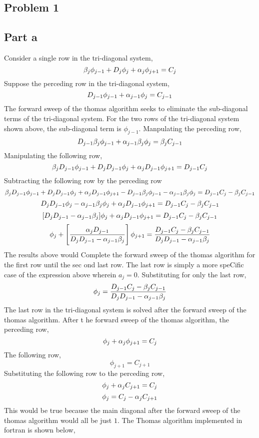 \documentclass[class=report, 12pt, crop=false]{standalone}
\begin{document}
\begin{center}
\section{Problem 1}
\begin{comment}
\end{comment}
\subsection{Part a}

Consider a single row in the tri-diagonal system,
$$\beta_j\phi_{j-1} + D_j\phi_{j} + \alpha_j\phi_{j+1} = C_j$$
Suppose the perceding row in the tri-diagonal system,
$$D_{j-1}\phi_{j-1} + \alpha_{j-1}\phi_{j} = C_{j-1}$$
The forward sweep of the thomas algorithm seeks to eliminate the sub-diagonal terms of the tri-diagonal system. For the two rows of the tri-diagonal system shown above, the sub-diagonal term is $\phi_{j-1}$. Manpulating the perceding row,
$$D_{j-1}\beta_j\phi_{j-1} + \alpha_{j-1}\beta_j\phi_{j} = \beta_jC_{j-1}$$
Manipulating the following row,
$$\beta_jD_{j-1}\phi_{j-1} + D_jD_{j-1}\phi_{j} + \alpha_jD_{j-1}\phi_{j+1} = D_{j-1}C_j$$
Subtracting the following row by the perceding row
$$\beta_jD_{j-1}\phi_{j-1} + D_jD_{j-1}\phi_{j} + \alpha_jD_{j-1}\phi_{j+1} - D_{j-1}\beta_j\phi_{j-1} - \alpha_{j-1}\beta_j\phi_{j} = D_{j-1}C_j - \beta_jC_{j-1}$$
$$D_jD_{j-1}\phi_{j} - \alpha_{j-1}\beta_j\phi_{j} + \alpha_jD_{j-1}\phi_{j+1} = D_{j-1}C_j - \beta_jC_{j-1}$$
$$[D_jD_{j-1} - \alpha_{j-1}\beta_j]\phi_{j} + \alpha_jD_{j-1}\phi_{j+1} = D_{j-1}C_j - \beta_jC_{j-1}$$
$$\phi_{j} + \left[\frac{\alpha_jD_{j-1}}{D_jD_{j-1} - \alpha_{j-1}\beta_j}\right]\phi_{j+1} = \frac{D_{j-1}C_j - \beta_jC_{j-1}}{D_jD_{j-1} - \alpha_{j-1}\beta_j}$$  
The results above would Complete the forward sweep of the thomas algorithm for the first row until the sec
ond last row. The last row is simply a more speCific case of the expression above wherein $a_j = 0$. Substituting for only the last row,
$$\phi_{j} = \frac{D_{j-1}C_j - \beta_jC_{j-1}}{D_jD_{j-1} - \alpha_{j-1}\beta_j}$$
The last row in the tri-diagonal system is solved after the forward sweep of the thomas algorithm. After t
he forward sweep of the thomas algorithm, the perceding row,
$$\phi_{j} + \alpha_{j}\phi_{j+1} = C_{j}$$
The following row,
$$\phi_{j+1} = C_{j+1}$$
Substituting the following row to the perceding row,
$$\phi_{j} + \alpha_{j}C_{j+1} = C_{j}$$
$$\phi_{j} = C_{j} - \alpha_{j}C_{j+1}$$
This would be true because the main diagonal after the forward sweep of the thomas algorithm would all be just $1$. The Thomas algorithm implemented in fortran is shown below,
\end{center}
\end{document}
